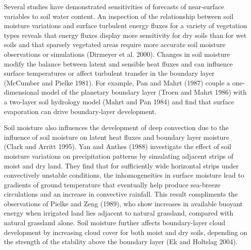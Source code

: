 \documentclass[twocolumn]{article}
\begin{document}
Several studies have demonstrated sensitivities of forecasts of near-surface variables to soil water content.  An inspection of the relationship between soil moisture variations and surface turbulent energy fluxes for a variety of vegetation types reveals that energy fluxes display more sensitivity for dry soils than for wet soils and that sparsely vegetated areas require more accurate soil moisture observations or simulations (Dirmeyer et al. 2000).  Changes in soil moisture modify the balance between latent and sensible heat fluxes and can influence surface temperatures or affect turbulent transfer in the boundary layer (McCumber and Pielke 1981).  For example, Pan and Mahrt (1987) couple a one-dimensional model of the planetary boundary layer (Troen and Mahrt 1986) with a two-layer soil hydrology model (Mahrt and Pan 1984) and find that surface evaporation can drive boundary-layer development.

Soil moisture also influences the development of deep convection due to the influence of soil moisture on latent heat fluxes and boundary layer moisture (Clark and Arritt 1995).  Yan and Anthes (1988) investigate the effect of soil moisture variations on precipitation patterns by simulating adjacent strips of moist and dry land.  They find that for sufficiently wide horizontal strips under convectively unstable conditions, the inhomogeneities in surface moisture lead to gradients of ground temperature that eventually help produce sea-breeze circulations and an increase in convective rainfall.  This result compliments the observations of Pielke and Zeng (1989), who show increases in available buoyant energy when irrigated land lies adjacent to natural grassland, compared with natural grassland alone.  Soil moisture further affects boundary-layer cloud development by increasing cloud cover for both moist and dry soils, depending on the strength of the stability above the boundary layer (Ek and Holtslag 2004).
\end{document}
